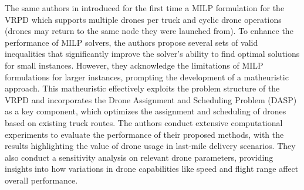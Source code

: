 \documentclass{article}
\begin{document}
	The same authors in \cite{Schermer2019} introduced for the first time a MILP formulation for the VRPD which supports multiple drones per truck and cyclic drone operations (drones may return to the same node they were launched from). To enhance the performance of MILP solvers, the authors propose several sets of valid inequalities that significantly improve the solver's ability to find optimal solutions for small instances. However, they acknowledge the limitations of MILP formulations for larger instances, prompting the development of a matheuristic approach. This matheuristic effectively exploits the problem structure of the VRPD and incorporates the Drone Assignment and Scheduling Problem (DASP) as a key component, which optimizes the assignment and scheduling of drones based on existing truck routes. The authors conduct extensive computational experiments to evaluate the performance of their proposed methods, with the results highlighting the value of drone usage in last-mile delivery scenarios. They also conduct a sensitivity analysis on relevant drone parameters, providing insights into how variations in drone capabilities like speed and flight range affect overall performance.
	\par
\end{document}
